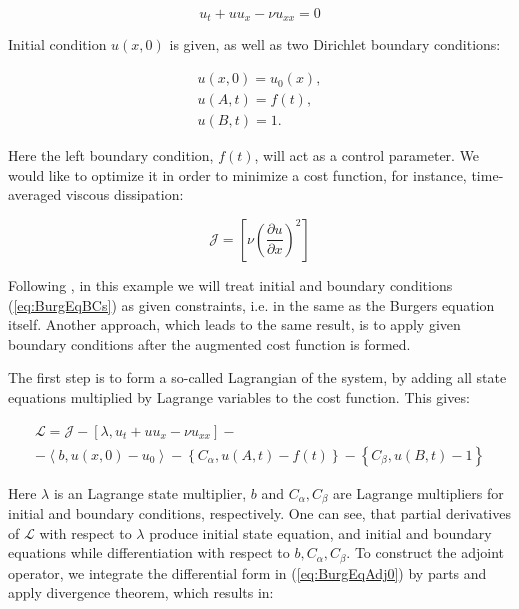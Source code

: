 \begin{equation}
\label{eq:BurgEq}
    u_t + u u_x - \nu u_{xx} = 0
\end{equation}

Initial condition $u(x,0)$ is given, as well as two Dirichlet boundary conditions:

\begin{subequations}
\label{eq:BurgEqBCs}
\begin{align}
    u(x,0) = u_0(x), \\
    u(A,t) = f(t), \\
    u(B,t) = 1.
\end{align}
\end{subequations}

Here the left boundary condition, $f(t)$, will act as a control parameter. We would like to optimize it in order to minimize a cost function, for instance, time-averaged viscous dissipation:

\begin{equation}
\mathcal{J} = \left[ \nu \left( \frac{\partial u}{\partial x} \right)^2 \right]
\end{equation}

Following \cite{CossuIntr}, in this example we will treat initial and boundary conditions (\ref{eq:BurgEqBCs}) as given constraints, i.e. in the same as the Burgers equation itself. Another approach, which leads to the same result, is to apply given boundary conditions after the augmented cost function is formed.

The first step is to form a so-called Lagrangian of the system, by adding all state equations multiplied by Lagrange variables to the cost function. This gives:

\begin{subequations}
\begin{align}
    \label{eq:BurgEqAdj0}
    \mathcal{L} = \mathcal{J} - \left[ \lambda, u_t + u u_x - \nu u_{xx} \right] -\\
    - \left< b, u(x,0) - u_0 \right> -  \left\{ C_{\alpha}, u(A,t) - f(t) \right\}  -  \left\{ C_{\beta}, u(B,t) - 1 \right\}
\end{align}
\end{subequations}

Here $\lambda$ is an Lagrange state multiplier, $b$ and $C_{\alpha}, C_{\beta}$ are Lagrange multipliers for initial and boundary conditions, respectively. One can see, that partial derivatives of $\mathcal{L}$ with respect to $\lambda$ produce initial state equation, and initial and boundary equations while differentiation with respect to $b, C_{\alpha}, C_{\beta}$. To construct the adjoint operator, we integrate the differential form in (\ref{eq:BurgEqAdj0}) by parts and apply divergence theorem, which results in:

